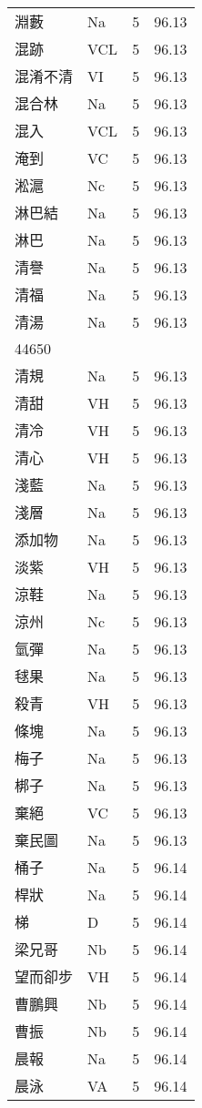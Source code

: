 \documentclass[twocolumn]{book}
\begin{document}
\begin{supertabular}{llrr}
淵藪 & Na & 5 &  96.13\\
混跡 & VCL & 5 &  96.13\\
混淆不清 & VI & 5 &  96.13\\
混合林 & Na & 5 &  96.13\\
混入 & VCL & 5 &  96.13\\
淹到 & VC & 5 &  96.13\\
淞滬 & Nc & 5 &  96.13\\
淋巴結 & Na & 5 &  96.13\\
淋巴 & Na & 5 &  96.13\\
清譽 & Na & 5 &  96.13\\
清福 & Na & 5 &  96.13\\
清湯 & Na & 5 &  96.13\\
44650\\
清規 & Na & 5 &  96.13\\
清甜 & VH & 5 &  96.13\\
清冷 & VH & 5 &  96.13\\
清心 & VH & 5 &  96.13\\
淺藍 & Na & 5 &  96.13\\
淺層 & Na & 5 &  96.13\\
添加物 & Na & 5 &  96.13\\
淡紫 & VH & 5 &  96.13\\
涼鞋 & Na & 5 &  96.13\\
涼州 & Nc & 5 &  96.13\\
氫彈 & Na & 5 &  96.13\\
毬果 & Na & 5 &  96.13\\
殺青 & VH & 5 &  96.13\\
條塊 & Na & 5 &  96.13\\
梅子 & Na & 5 &  96.13\\
梆子 & Na & 5 &  96.13\\
棄絕 & VC & 5 &  96.13\\
棄民圖 & Na & 5 &  96.13\\
桶子 & Na & 5 &  96.14\\
桿狀 & Na & 5 &  96.14\\
梯 & D & 5 &  96.14\\
梁兄哥 & Nb & 5 &  96.14\\
望而卻步 & VH & 5 &  96.14\\
曹鵬興 & Nb & 5 &  96.14\\
曹振 & Nb & 5 &  96.14\\
晨報 & Na & 5 &  96.14\\
晨泳 & VA & 5 &  96.14\\

\end{supertabular}
\end{document}
